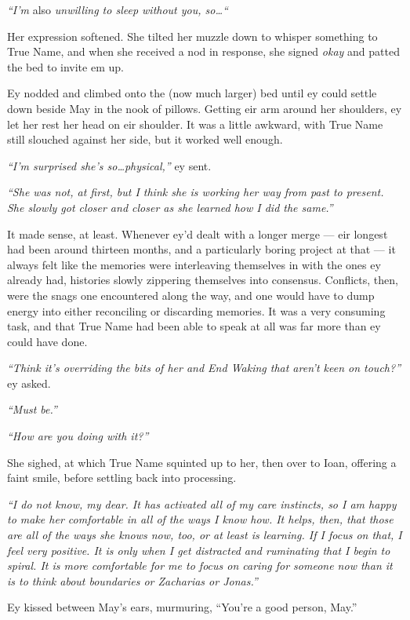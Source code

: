 \emph{``I'm} also \emph{unwilling to sleep without you, so\ldots``}

Her expression softened. She tilted her muzzle down to whisper something to True Name, and when she received a nod in response, she signed \emph{okay} and patted the bed to invite em up.

Ey nodded and climbed onto the (now much larger) bed until ey could settle down beside May in the nook of pillows. Getting eir arm around her shoulders, ey let her rest her head on eir shoulder. It was a little awkward, with True Name still slouched against her side, but it worked well enough.

\emph{``I'm surprised she's so\ldots physical,''} ey sent.

\emph{``She was not, at first, but I think she is working her way from past to present. She slowly got closer and closer as she learned how I did the same.''}

It made sense, at least. Whenever ey'd dealt with a longer merge — eir longest had been around thirteen months, and a particularly boring project at that — it always felt like the memories were interleaving themselves in with the ones ey already had, histories slowly zippering themselves into consensus. Conflicts, then, were the snags one encountered along the way, and one would have to dump energy into either reconciling or discarding memories. It was a very consuming task, and that True Name had been able to speak at all was far more than ey could have done.

\emph{``Think it's overriding the bits of her and End Waking that aren't keen on touch?''} ey asked.

\emph{``Must be.''}

\emph{``How are you doing with it?''}

She sighed, at which True Name squinted up to her, then over to Ioan, offering a faint smile, before settling back into processing.

\emph{``I do not know, my dear. It has activated all of my care instincts, so I am happy to make her comfortable in all of the ways I know how. It helps, then, that those are all of the ways she knows now, too, or at least is learning. If I focus on that, I feel very positive. It is only when I get distracted and ruminating that I begin to spiral. It is more comfortable for me to focus on caring for someone now than it is to think about boundaries or Zacharias or Jonas.''}

Ey kissed between May's ears, murmuring, ``You're a good person, May.''

